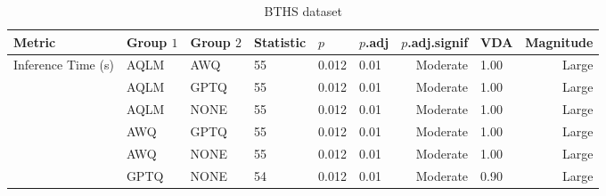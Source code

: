 \begin{table}[ht]
\centering
\caption*{BTHS dataset}
\begin{tabular}{llllllrlr}
\toprule
Metric & Group $1$ & Group $2$ & Statistic & $p$ & $p$.adj & $p$.adj.signif & VDA & Magnitude\\
\midrule
Inference Time (s) & AQLM & AWQ & 55 & 0.012 & 0.01 & Moderate & 1.00 & Large \\
\phantom & AQLM & GPTQ & 55 & 0.012 & 0.01 & Moderate & 1.00 & Large \\
\phantom & AQLM & NONE & 55 & 0.012 & 0.01 & Moderate & 1.00 & Large \\
\phantom & AWQ & GPTQ & 55 & 0.012 & 0.01 & Moderate & 1.00 & Large \\
\phantom & AWQ & NONE & 55 & 0.012 & 0.01 & Moderate & 1.00 & Large \\
\phantom & GPTQ & NONE & 54 & 0.012 & 0.01 & Moderate & 0.90 & Large \\
\bottomrule
\end{tabular}
\label{tab:RQ2_posthoc_full}
\end{table}

